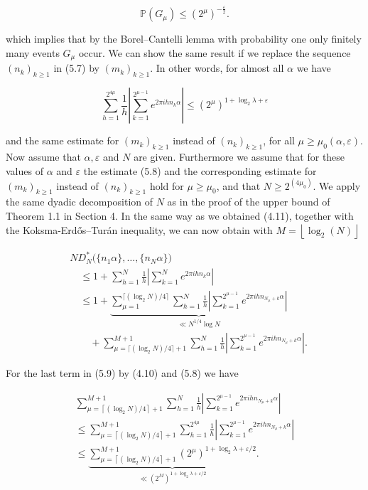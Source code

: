 \documentclass[10pt]{article}
\newcommand{\1}{\mathbf{1}}
\begin{document}
$$
\mathbb{P}\left(G_{\mu}\right) \leqslant\left(2^{\mu}\right)^{-\frac{\varepsilon}{2}} .
$$

which implies that by the Borel--Cantelli lemma with probability one only finitely many events $G_{\mu}$ occur. We can show the same result if we replace the sequence $\left(n_{k}\right)_{k \geqslant 1}$ in (5.7) by $\left(m_{k}\right)_{k \geqslant 1}$. In other words, for almost all $\alpha$ we have


\begin{equation*}
\sum_{h=1}^{2^{4 \mu}} \frac{1}{h}\left|\sum_{k=1}^{2^{\mu-1}} e^{2 \pi i h n_{k} \alpha}\right| \leqslant\left(2^{\mu}\right)^{1+\log _{2} \lambda+\varepsilon} \tag{5.8}
\end{equation*}


and the same estimate for $\left(m_{k}\right)_{k \geqslant 1}$ instead of $\left(n_{k}\right)_{k \geqslant 1}$, for all $\mu \geqslant \mu_{0}(\alpha, \varepsilon)$.\\
Now assume that $\alpha, \varepsilon$ and $N$ are given. Furthermore we assume that for these values of $\alpha$ and $\varepsilon$ the estimate (5.8) and the corresponding estimate for $\left(m_{k}\right)_{k \geqslant 1}$ instead of $\left(n_{k}\right)_{k \geqslant 1}$ hold for $\mu \geqslant \mu_{0}$, and that $N \geqslant 2^{\left(4 \mu_{0}\right)}$. We apply the same dyadic decomposition of $N$ as in the proof of the upper bound of Theorem 1.1 in Section 4. In the same way as we obtained (4.11), together with the Koksma-Erdős--Turán inequality, we can now obtain with $M=\left\lfloor\log _{2}(N)\right\rfloor$


\begin{align*}
&ND_N^*\bigl(\{n_1\alpha\},\ldots,\{n_N\alpha\}\bigr) \tag{5.9}\\
&\quad\leqslant 1+\sum_{h=1}^{N}\frac1h
 \left|\sum_{k=1}^{N}e^{2\pi i h n_k\alpha}\right|\\
&\quad\leqslant1+
 \underbrace{\sum_{\mu=1}^{\lceil(\log_2N)/4\rceil}
 \sum_{h=1}^{N}\frac1h
 \left|\sum_{k=1}^{2^{\mu-1}}e^{2\pi i h n_{N_\mu+k}\alpha}\right|}_{\ll N^{1/4}\log N}\\
&\qquad+\sum_{\mu=\lceil(\log_2N)/4\rceil+1}^{M+1}
 \sum_{h=1}^{N}\frac1h
 \left|\sum_{k=1}^{2^{\mu-1}}e^{2\pi i h n_{N_\mu+k}\alpha}\right|.
\end{align*}

For the last term in (5.9) by (4.10) and (5.8) we have

$$
\begin{gathered}
\sum_{\mu=\left\lceil\left(\log _{2} N\right) / 4\right\rceil+1}^{M+1} \sum_{h=1}^{N} \frac{1}{h}\left|\sum_{k=1}^{2^{\mu-1}} e^{2 \pi i h n_{N_{\mu}+k} \alpha}\right| \\
\leqslant \sum_{\mu=\left\lceil\left(\log _{2} N\right) / 4\right\rceil+1}^{M+1} \sum_{h=1}^{2^{4 \mu}} \frac{1}{h}\left|\sum_{k=1}^{2^{\mu-1}} e^{2 \pi i h n_{N_{\mu}+k} \alpha}\right| \\
\leqslant \underbrace{\sum_{\mu=\left\lceil\left(\log _{2} N\right) / 4\right\rceil+1}^{M+1}\left(2^{\mu}\right)^{1+\log _{2} \lambda+\varepsilon / 2}}_{\ll\left(2^{M}\right)^{1+\log _{2} \lambda+\varepsilon / 2}} .
\end{gathered}
$$
\end{document}
